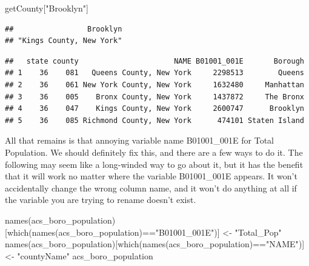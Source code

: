 \documentclass[
  openany]{book}
\newenvironment{Shaded}{\begin{snugshade}}{\end{snugshade}}
\newcommand{\FunctionTok}[1]{\textcolor[rgb]{0.00,0.00,0.00}{#1}}
\newcommand{\NormalTok}[1]{#1}
\newcommand{\OtherTok}[1]{\textcolor[rgb]{0.56,0.35,0.01}{#1}}
\newcommand{\SpecialCharTok}[1]{\textcolor[rgb]{0.00,0.00,0.00}{#1}}
\newcommand{\StringTok}[1]{\textcolor[rgb]{0.31,0.60,0.02}{#1}}
\begin{document}
\begin{Shaded}
\begin{Highlighting}[]
\NormalTok{getCounty[}\StringTok{"Brooklyn"}\NormalTok{]}
\end{Highlighting}
\end{Shaded}

\begin{verbatim}
##                 Brooklyn 
## "Kings County, New York"
\end{verbatim}

\begin{Shaded}
\end{Shaded}

\begin{verbatim}
##   state county                      NAME B01001_001E       Borough
## 1    36    081   Queens County, New York     2298513        Queens
## 2    36    061 New York County, New York     1632480     Manhattan
## 3    36    005    Bronx County, New York     1437872     The Bronx
## 4    36    047    Kings County, New York     2600747      Brooklyn
## 5    36    085 Richmond County, New York      474101 Staten Island
\end{verbatim}

All that remains is that annoying variable name B01001\_001E for Total Population. We should definitely fix this, and there are a few ways to do it. The following may seem like a long-winded way to go about it, but it has the benefit that it will work no matter where the variable B01001\_001E appears. It won't accidentally change the wrong column name, and it won't do anything at all if the variable you are trying to rename doesn't exist.

\begin{Shaded}
\begin{Highlighting}[]
\FunctionTok{names}\NormalTok{(acs\_boro\_population)[}\FunctionTok{which}\NormalTok{(}\FunctionTok{names}\NormalTok{(acs\_boro\_population)}\SpecialCharTok{==}\StringTok{"B01001\_001E"}\NormalTok{)] }\OtherTok{\textless{}{-}} \StringTok{"Total\_Pop"}
\FunctionTok{names}\NormalTok{(acs\_boro\_population)[}\FunctionTok{which}\NormalTok{(}\FunctionTok{names}\NormalTok{(acs\_boro\_population)}\SpecialCharTok{==}\StringTok{"NAME"}\NormalTok{)] }\OtherTok{\textless{}{-}} \StringTok{"countyName"}
\NormalTok{acs\_boro\_population}
\end{Highlighting}
\end{Shaded}
\end{document}
